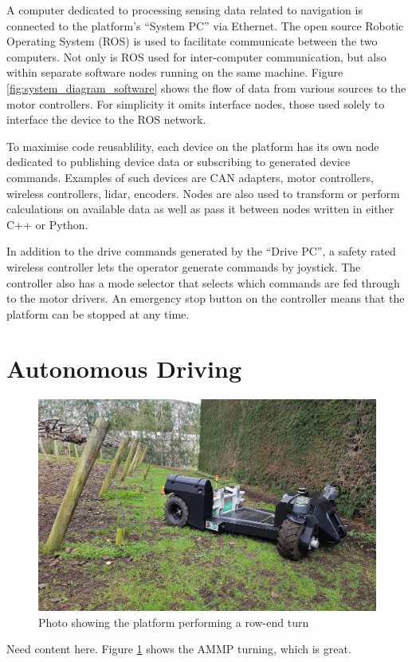 \documentclass[preprint,authoryear,12pt]{elsarticle}
\begin{document}
    A computer dedicated to processing sensing data related to navigation is connected to the platform's ``System PC'' via Ethernet.
    The open source Robotic Operating System (ROS) is used to facilitate communicate between the two computers.
    Not only is ROS used for inter-computer communication, but also within separate software nodes running on the same machine.
    Figure \ref{fig:system_diagram_software} shows the flow of data from various sources to the motor controllers.
    For simplicity it omits interface nodes, those used solely to interface the device to the ROS network.

    To maximise code reusablility, each device on the platform has its own node dedicated to publishing device data or subscribing to generated device commands.
    Examples of such devices are CAN adapters, motor controllers, wireless controllers, lidar, encoders.
    Nodes are also used to transform or perform calculations on available data as well as pass it between nodes written in either C++ or Python.

    In addition to the drive commands generated by the ``Drive PC'', a safety rated wireless controller lets the operator generate commands by joystick.
    The controller also has a mode selector that selects which commands are fed through to the motor drivers.
    An emergency stop button on the controller means that the platform can be stopped at any time.


\section{Autonomous Driving}
\label{sect:autonomous}
    \begin{figure}[htb]
        \centering
        \includegraphics[width=\linewidth]{imgs/photos/suzy_turning.jpg}
        \caption{
            Photo showing the platform performing a row-end turn
        }
        \label{fig:suzy_turning}
    \end{figure}
    \color{red}
    Need content here.
    \color{black}
    Figure \ref{fig:suzy_turning} shows the AMMP turning, which is great.
\end{document}

